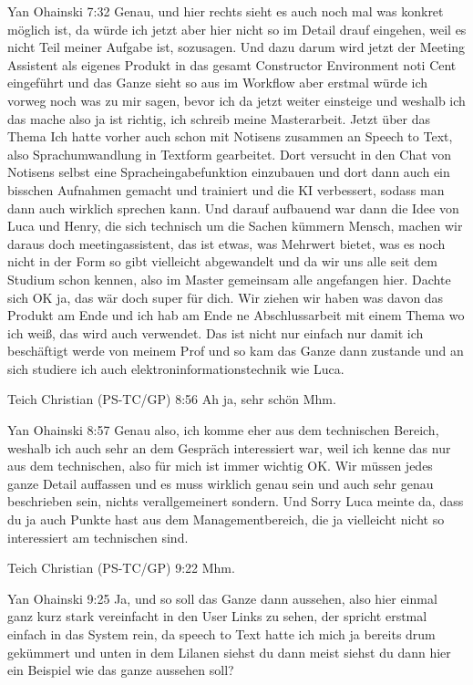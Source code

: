 Yan Ohainski   7:32
Genau, und hier rechts sieht es auch noch mal was konkret möglich ist, da würde ich jetzt aber hier nicht so im Detail drauf eingehen, weil es nicht Teil meiner Aufgabe ist, sozusagen.
Und dazu darum wird jetzt der Meeting Assistent als eigenes Produkt in das gesamt Constructor Environment noti Cent eingeführt und das Ganze sieht so aus im Workflow aber erstmal würde ich vorweg noch was zu mir sagen, bevor ich da jetzt weiter einsteige und weshalb ich das mache also ja ist richtig, ich schreib meine Masterarbeit.
Jetzt über das Thema Ich hatte vorher auch schon mit Notisens zusammen an Speech to Text, also Sprachumwandlung in Textform gearbeitet. Dort versucht in den Chat von Notisens selbst eine Spracheingabefunktion einzubauen und dort dann auch ein bisschen Aufnahmen gemacht und trainiert und die KI verbessert, sodass man dann auch wirklich sprechen kann.
Und darauf aufbauend war dann die Idee von Luca und Henry, die sich technisch um die Sachen kümmern Mensch, machen wir daraus doch meetingassistent, das ist etwas, was Mehrwert bietet, was es noch nicht in der Form so gibt vielleicht abgewandelt und da wir uns alle seit dem Studium schon kennen, also im Master gemeinsam alle angefangen hier.
Dachte sich OK ja, das wär doch super für dich. Wir ziehen wir haben was davon das Produkt am Ende und ich hab am Ende ne Abschlussarbeit mit einem Thema wo ich weiß, das wird auch verwendet. Das ist nicht nur einfach nur damit ich beschäftigt werde von meinem Prof und so kam das Ganze dann zustande und an sich studiere ich auch elektroninformationstechnik wie Luca.

Teich Christian (PS-TC/GP)   8:56
Ah ja, sehr schön Mhm.

Yan Ohainski   8:57
Genau also, ich komme eher aus dem technischen Bereich, weshalb ich auch sehr an dem Gespräch interessiert war, weil ich kenne das nur aus dem technischen, also für mich ist immer wichtig OK. Wir müssen jedes ganze Detail auffassen und es muss wirklich genau sein und auch sehr genau beschrieben sein, nichts verallgemeinert sondern.
Und Sorry Luca meinte da, dass du ja auch Punkte hast aus dem Managementbereich, die ja vielleicht nicht so interessiert am technischen sind.

Teich Christian (PS-TC/GP)   9:22
Mhm.

Yan Ohainski   9:25
Ja, und so soll das Ganze dann aussehen, also hier einmal ganz kurz stark vereinfacht in den User Links zu sehen, der spricht erstmal einfach in das System rein, da speech to Text hatte ich mich ja bereits drum gekümmert und unten in dem Lilanen siehst du dann meist siehst du dann hier ein Beispiel wie das ganze aussehen soll?

